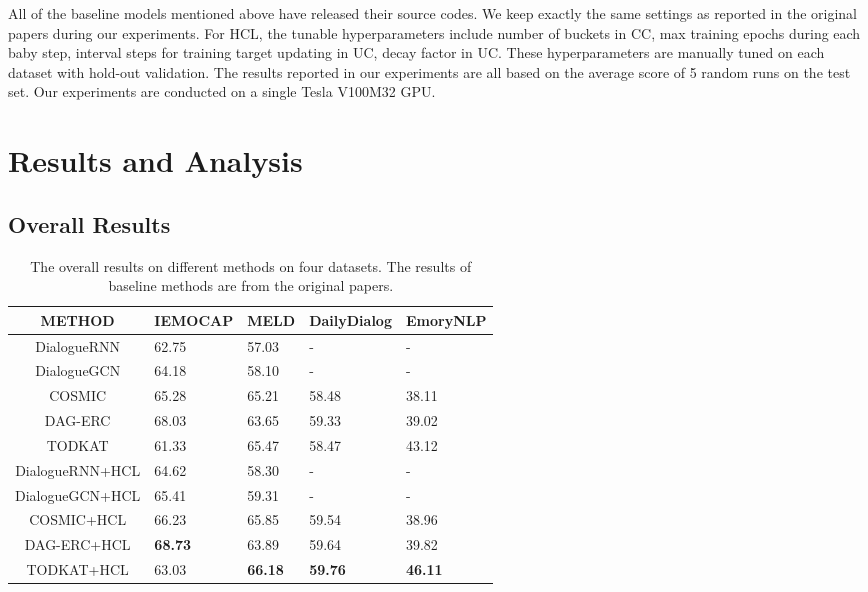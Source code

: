 \documentclass[letterpaper]{article} \usepackage{aaai22}  \usepackage{times}  \usepackage{helvet}  \usepackage{courier}  \usepackage[hyphens]{url}  \usepackage{graphicx} \urlstyle{rm} \def\UrlFont{\rm}  \usepackage{natbib}  \usepackage{caption} \DeclareCaptionStyle{ruled}{labelfont=normalfont,labelsep=colon,strut=off} \frenchspacing  \setlength{\pdfpagewidth}{8.5in}  \setlength{\pdfpageheight}{11in}
\begin{document}
All of the baseline models mentioned above have released their source codes. We keep exactly the same settings as reported in the original papers during our experiments. For HCL, the tunable hyperparameters include number of buckets in CC, max training epochs during each baby step, interval steps for training target updating in UC, decay factor in UC. These hyperparameters are manually tuned on each dataset with hold-out validation. The results reported in our experiments are all based on the average score of 5 random runs on the test set. Our experiments are conducted on a single Tesla V100M32 GPU.


\section{Results and Analysis}

\subsection{Overall Results}


\begin{table*}
	\centering  
	\footnotesize 
	\begin{tabular}{cllll} 
		\toprule 
		METHOD&IEMOCAP&MELD&DailyDialog&EmoryNLP\\ 
		\midrule 	
		DialogueRNN&62.75&57.03&-&-\\ 
		DialogueGCN&64.18&58.10&-&-\\ 
		COSMIC&65.28&65.21&58.48&38.11\\ 
		DAG-ERC&68.03&63.65&59.33&39.02\\ 
		TODKAT&61.33&65.47&58.47&43.12\\ 
		\midrule 	
		DialogueRNN+HCL&64.62  & 58.30 &-&-\\ 
		DialogueGCN+HCL&65.41  & 59.31 &-&-\\ 
		COSMIC+HCL&66.23&65.85&59.54&38.96\\
		DAG-ERC+HCL&\bf{68.73}  &63.89&59.64&39.82\\ 
		TODKAT+HCL&63.03&\bf{66.18}&\bf{59.76}&\bf{46.11}\\ 
		
		\bottomrule 
	\end{tabular}  
	\caption{ The overall results on different methods on four datasets. The results of baseline methods are from the original papers.} \label{tab:performance_comparison}  
\end{table*}
\end{document}
